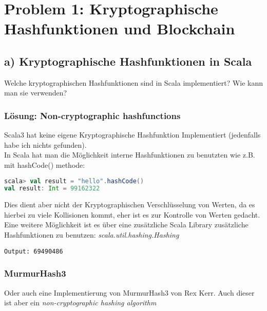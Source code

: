 \section*{Problem 1: Kryptographische Hashfunktionen und Blockchain}

\subsection*{a) Kryptographische Hashfunktionen in Scala}

Welche kryptographischen Hashfunktionen sind in Scala implementiert?  
Wie kann man sie verwenden?


\subsubsection*{Lösung: Non-cryptographic hashfunctions}

Scala3 hat keine eigene Kryptographische Hashfunktion Implementiert (jedenfalls habe ich nichts gefunden). \\

In Scala hat man die Möglichkeit interne Hashfunktionen zu benutzten wie z.B. mit hashCode() methode\cite{hashCode}:
\begin{lstlisting}[language=Scala]
scala> val result = "hello".hashCode()
val result: Int = 99162322
\end{lstlisting}
Dies dient aber nicht der Kryptographischen Verschlüsselung von Werten, da es hierbei zu viele Kollisionen kommt, eher ist es zur Kontrolle von Werten gedacht.\\

Eine weitere Möglichkeit ist es über eine zusätzliche Scala Library zusätzliche Hashfunktionen zu benutzen: \textit{scala.util.hashing.Hashing} \cite{scala.util}\\



\begin{verbatim}
Output: 69490486
\end{verbatim}

\subsubsection*{MurmurHash3}

Oder auch eine Implementierung von MurmurHash3 von Rex Kerr. Auch dieser ist aber ein \textit{non-cryptographic hashing algorithm} \cite{murmurhash3}

